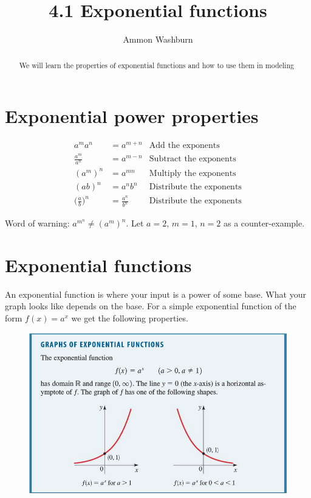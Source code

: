 \documentclass{tufte-handout}
\title{4.1 Exponential functions}
\author[AW]{Ammon Washburn}
\begin{document}
\maketitle

\begin{abstract}
We will learn the properties of exponential functions and how to use them in modeling
\end{abstract}

\section{Exponential power properties}

\begin{align*}
a^m a^n & = a^{m+n}  & \textrm{Add the exponents} \\
\frac{a^m}{a^n} & =a^{m-n} & \textrm{Subtract the exponents} \\
(a^m)^n & = a^{mn} & \textrm{Multiply the exponents} \\
(ab)^n & = a^nb^n & \textrm{Distribute the exponents} \\
\bigg ( \frac{a}{b} \bigg )^n & = \frac{a^n}{b^n} & \textrm{Distribute the exponents}
\end{align*}

Word of warning: $a^{m^n} \neq (a^m)^n$.  Let $a=2$, $m=1$, $n=2$ as a counter-example.

\section{Exponential functions}
An exponential function is where your input is a power of some base.  What your graph looks like depends on the base.  For a simple exponential function of the form $f(x) = a^x$ we get the following properties.

\begin{figure}
\centering
\includegraphics[width=\linewidth]{ExponentialGraphs.png}
\end{figure}
\end{document}
